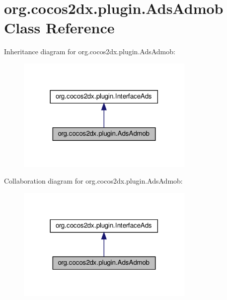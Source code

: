 \hypertarget{classorg_1_1cocos2dx_1_1plugin_1_1AdsAdmob}{}\section{org.\+cocos2dx.\+plugin.\+Ads\+Admob Class Reference}
\label{classorg_1_1cocos2dx_1_1plugin_1_1AdsAdmob}


Inheritance diagram for org.\+cocos2dx.\+plugin.\+Ads\+Admob\+:
\nopagebreak
\begin{figure}[H]
\begin{center}
\leavevmode
\includegraphics[width=242pt]{classorg_1_1cocos2dx_1_1plugin_1_1AdsAdmob__inherit__graph}
\end{center}
\end{figure}


Collaboration diagram for org.\+cocos2dx.\+plugin.\+Ads\+Admob\+:
\nopagebreak
\begin{figure}[H]
\begin{center}
\leavevmode
\includegraphics[width=242pt]{classorg_1_1cocos2dx_1_1plugin_1_1AdsAdmob__coll__graph}
\end{center}
\end{figure}
